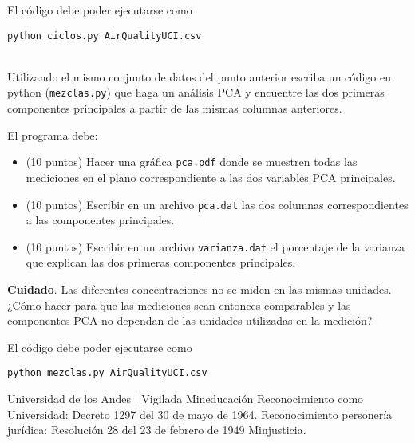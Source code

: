 \documentclass[11pt,letterpaper]{exam}
\begin{document}
\begin{questions}
El c\'odigo debe poder ejecutarse como 
\begin{verbatim}
python ciclos.py AirQualityUCI.csv
\end{verbatim}


 \\

Utilizando el mismo conjunto de datos del punto anterior escriba un
c\'odigo en python (\verb"mezclas.py") que haga un an\'alisis PCA y
encuentre las dos primeras componentes principales a partir de las
mismas columnas anteriores. 

El programa debe:
\begin{itemize}
\item (10 puntos) Hacer una gr\'afica \verb"pca.pdf" donde se muestren
  todas las mediciones en el plano correspondiente a las dos variables PCA
  principales. 
\item (10 puntos) Escribir en un archivo \verb"pca.dat" las dos columnas
  correspondientes a las componentes principales.
\item (10 puntos) Escribir en un archivo \verb"varianza.dat" el porcentaje de la
  varianza que explican las dos primeras componentes principales.
\end{itemize}

{\bf Cuidado}. Las diferentes concentraciones no se miden en las mismas
unidades. ¿C\'omo hacer para que las mediciones sean entonces
comparables y las componentes PCA no dependan de las
unidades utilizadas en la medici\'on?

El c\'odigo debe poder ejecutarse como 
\begin{verbatim}
python mezclas.py AirQualityUCI.csv
\end{verbatim}




\end{questions}



\vfill

{\small Universidad de los Andes | Vigilada Mineducación
Reconocimiento como Universidad: Decreto 1297 del 30 de mayo de 1964.
Reconocimiento personería jurídica: Resolución 28 del 23 de febrero de
1949 Minjusticia.}  
\end{document}
